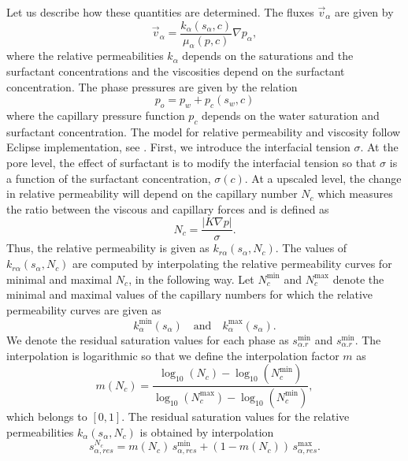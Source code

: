 \documentclass[11pt]{amsart}
\newcommand{\grad}{\nabla}
\newcommand{\abs}[1]{\left| #1\right|}
\begin{document}
Let us describe how these quantities are determined. The fluxes $\vec{v}_\alpha$ are given by
\begin{equation*}
  \vec{v}_\alpha = \frac{k_{\alpha}(s_\alpha, c)}{\mu_{\alpha}(p, c)}\grad p_\alpha,
\end{equation*}
where the relative permeabilities $k_{\alpha}$ depends on the saturations and the surfactant
concentrations and the viscosities depend on the surfactant concentration. The phase pressures are
given by the relation
\begin{equation}
  p_o = p_w + p_c(s_w, c) 
\end{equation}
where the capillary pressure function $p_c$ depends on the water saturation and surfactant
concentration. The model for relative permeability and viscosity follow Eclipse implementation, see
\cite{eclipse, jorgensen}. First, we introduce the interfacial tension $\sigma$. At the pore level,
the effect of surfactant is to modify the interfacial tension so that $\sigma$ is a function of the
surfactant concentration, $\sigma(c)$. At a upscaled level, the change in relative permeability will
depend on the capillary number $N_c$ which measures the ratio between the viscous and capillary
forces and is defined as
\begin{equation}
  \label{eq:defNc}
  N_c = \frac{\abs{K\grad p}}{\sigma}.
\end{equation}
Thus, the relative permeability is given as $k_{r\alpha}(s_\alpha, N_c)$. The values of
$k_{r\alpha}(s_\alpha, N_c)$ are computed by interpolating the relative permeability curves for
minimal and maximal $N_c$, in the following way. Let $N_c^{\min}$ and $N_c^{\max}$ denote the
minimal and maximal values of the capillary numbers for which the relative permeability curves are
given as
\begin{equation*}
  k_{\alpha}^{\min}(s_\alpha)\quad\text{and}\quad k_{\alpha}^{\max}(s_\alpha).
\end{equation*}
We denote the residual saturation values for each phase as $s_{\alpha.r}^{\min}$ and
$s_{\alpha.r}^{\min}$. The interpolation is logarithmic so that we define the interpolation factor
$m$ as
\begin{equation} 
  \label{eq:defm}
  m(N_c) = \frac{\log_{10}(N_c) - \log_{10}(N_c^{\min})}{\log_{10}(N_c^{\max}) - \log_{10}(N_c^{\min})},
\end{equation}
which belongs to $[0,1]$. The residual saturation values for the relative permeabilities
$k_{\alpha}(s_\alpha, N_c)$ is obtained by interpolation
\begin{equation}
  \label{eq:srhat}
  s_{\alpha,res}^{N_c} = m(N_c)\,s_{\alpha,res}^{\min} + (1 - m(N_c))\,s_{\alpha,res}^{\max}.
\end{equation}
\end{document}
